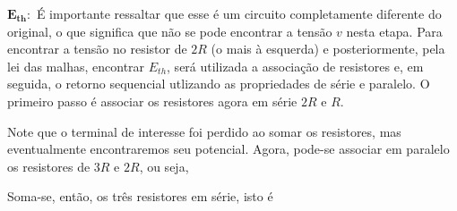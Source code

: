 \documentclass{article}
\numberwithin{equation}{section}
\begin{document}
\noindent $\mathbf{E_{th}:}$ É importante ressaltar que esse é um circuito completamente diferente do original, o que significa que não se pode encontrar a tensão $v$ nesta etapa. Para encontrar a tensão no resistor de $2R$ (o mais à esquerda) e posteriormente, pela lei das malhas, encontrar $E_{th}$, será utilizada a associação de resistores e, em seguida, o retorno sequencial utlizando as propriedades de série e paralelo. O primeiro passo é associar os resistores agora em série $2R$ e $R$.

\begin{center}
\end{center}

\noindent Note que o terminal de interesse foi perdido ao somar os resistores, mas eventualmente encontraremos seu potencial. Agora, pode-se associar em paralelo os resistores de $3R$ e $2R$, ou seja,

\begin{center}
\end{center}

\noindent Soma-se, então, os três resistores em série, isto é

\begin{center}
\end{center}
\end{document}
